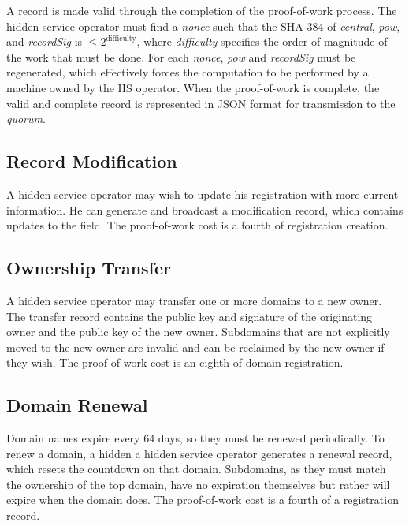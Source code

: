A record is made valid through the completion of the proof-of-work process. The hidden service operator must find a \emph{nonce} such that the SHA-384 of \emph{central}, \emph{pow}, and \emph{recordSig} is $ \leq 2^\textrm{difficulty} $, where \emph{difficulty} specifies the order of magnitude of the work that must be done. For each \emph{nonce}, \emph{pow} and \emph{recordSig} must be regenerated, which effectively forces the computation to be performed by a machine owned by the HS operator. When the proof-of-work is complete, the valid and complete record is represented in JSON format for transmission to the \emph{quorum}.


\subsection{Record Modification}

A hidden service operator may wish to update his registration with more current information. He can generate and broadcast a modification record, which contains updates to the field. The proof-of-work cost is a fourth of registration creation.

\subsection{Ownership Transfer}

A hidden service operator may transfer one or more domains to a new owner. The transfer record contains the public key and signature of the originating owner and the public key of the new owner. Subdomains that are not explicitly moved to the new owner are invalid and can be reclaimed by the new owner if they wish. The proof-of-work cost is an eighth of domain registration.

\subsection{Domain Renewal}

Domain names expire every 64 days, so they must be renewed periodically. To renew a domain, a hidden a hidden service operator generates a renewal record, which resets the countdown on that domain. Subdomains, as they must match the ownership of the top domain, have no expiration themselves but rather will expire when the domain does. The proof-of-work cost is a fourth of a registration record.


